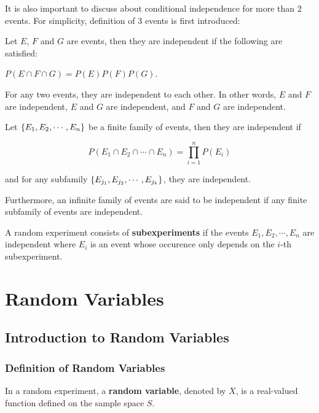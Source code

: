 \documentclass[a4paper,12pt]{article}
\begin{document}
It is also important to discuss about conditional independence for more than $2$ events. For simplicity, definition of $3$ events is first introduced:\n

\begin{dft}
  Let $E$, $F$ and $G$ are events, then they are independent if the following are satisfied:

  \begin{alist}
    \item $P(E\cap F\cap G)=P(E)P(F)P(G)$.
    \item For any two events, they are independent to each other. In other words, $E$ and $F$ are independent, $E$ and $G$ are independent, and $F$ and $G$ are independent.
  \end{alist}
\end{dft}\n

\begin{dft}
  Let $\left\{ E_{1},E_{2},\cdots,E_{n}\right\}$ be a finite family of events, then they are independent if
  
  $$P(E_{1}\cap E_{2}\cap\cdots\cap E_{n})=\prod_{i=1}^{n}P(E_{i})$$\s

  and for any subfamily $\left\{ E_{j_{1}},E_{j_{2}},\cdots,E_{j_{k}}\right\}$, they are independent.\n

  Furthermore, an infinite family of events are said to be independent if any finite subfamily of events are independent.
\end{dft}\n

\begin{dft}
  A random experiment consists of \textbf{subexperiments} if the events $E_{1},E_{2},\cdots,E_{n}$ are independent where $E_{i}$ is an event whose occurence only depends on the $i$-th subexperiment.
\end{dft}

\pagebreak

\section{Random Variables}
\subsection{Introduction to Random Variables}
\subsubsection{Definition of Random Variables}
\begin{dft}
  In a random experiment, a \textbf{random variable}, denoted by $X$, is a real-valued function defined on the sample space $S$.
\end{dft}\n
\end{document}
